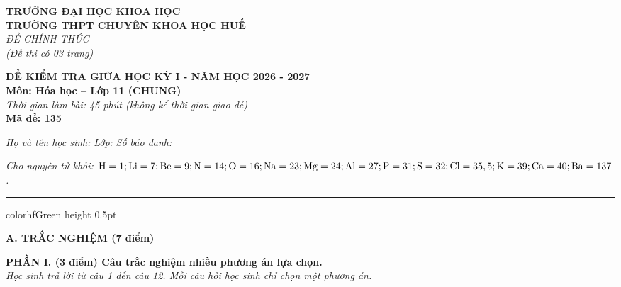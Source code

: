 \documentclass[11pt,a4paper]{article}
\begin{document}
\begin{minipage}[t]{0.48\textwidth}
\textbf{TRƯỜNG ĐẠI HỌC KHOA HỌC}\\
\textbf{TRƯỜNG THPT CHUYÊN KHOA HỌC HUẾ}\\
\textit{ĐỀ CHÍNH THỨC}\\
\textit{(Đề thi có 03 trang)}
\end{minipage}
\hfill
\begin{minipage}[t]{0.48\textwidth}
\raggedleft
\textbf{\color{hfRed}ĐỀ KIỂM TRA GIỮA HỌC KỲ I - NĂM HỌC 2026 - 2027}\\
\textbf{Môn: Hóa học -- Lớp 11 (CHUNG)}\\
\textit{Thời gian làm bài: 45 phút (không kể thời gian giao đề)}\\
\textbf{Mã đề: 135}
\end{minipage}

\vspace{4pt}
\noindent
\textit{Họ và tên học sinh:} \dotfill \textit{Lớp:} \dotfill \textit{Số báo danh:} \dotfill

\vspace{3pt}
\noindent
\textit{\footnotesize Cho nguyên tử khối: $\ce{H}=1; \ce{Li}=7; \ce{Be}=9; \ce{N}=14; \ce{O}=16; \ce{Na}=23; \ce{Mg}=24; \ce{Al}=27; \ce{P}=31; \ce{S}=32; \ce{Cl}=35,5; \ce{K}=39; \ce{Ca}=40; \ce{Ba}=137$.}

\vspace{3pt}
\hrule color{hfGreen} height 0.5pt

\vspace{4pt}
\noindent
{\color{mainGreen}\textbf{\Large A. TRẮC NGHIỆM (7 điểm)}}

\vspace{3pt}
\noindent
{\color{mainGreen}\textbf{\large PHẦN I. (3 điểm) Câu trắc nghiệm nhiều phương án lựa chọn.}}\\
\textit{\small Học sinh trả lời từ câu 1 đến câu 12. Mỗi câu hỏi học sinh chỉ chọn một phương án.}
\vspace{2pt}
\end{document}
